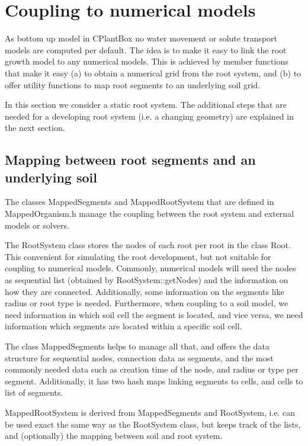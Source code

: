 \newpage
\section{Coupling to numerical models}

As bottom up model in CPlantBox no water movement or solute transport models are computed per default. The idea is to make it easy to link the root growth model to any numerical models. This is achieved by member functions that make it easy (a) to obtain a numerical grid from the root system, and (b) to offer utility functions to map root segments to an underlying soil grid. 

In this section we consider a static root system. The additional steps that are needed for a developing root system (i.e. a changing geometry) are explained in the next section. 

\subsection{Mapping between root segments and an underlying soil}

The classes MappedSegments and MappedRootSystem that are defined in MappedOrganism.h manage the coupling between the root system and external models or solvers. 

The RootSystem class stores the nodes of each root per root in the class Root. This convenient for simulating the root development, but not suitable for coupling to numerical models. Commonly, numerical models will need the nodes as sequential list (obtained by RootSystem::getNodes) and the information on how they are connected. Additionally, some information on the segments like radius or root type is needed. Furthermore, when coupling to a soil model, we need information in which soil cell the segment is located, and vice versa, we need information which segments are located within a specific soil cell. 

The class MappedSegments helps to manage all that, and offers the data structure for sequential nodes, connection data as segments, and the most commonly needed data such as creation time of the node, and radius or type per segment. Additionally, it has two hash maps linking segments to cells, and cells to list of segments.

MappedRootSystem is derived from MappedSegments and RootSystem, i.e. can be used exact the same way as the RootSystem class, but keeps track of the lists, and (optionally) the mapping between soil and root system.


